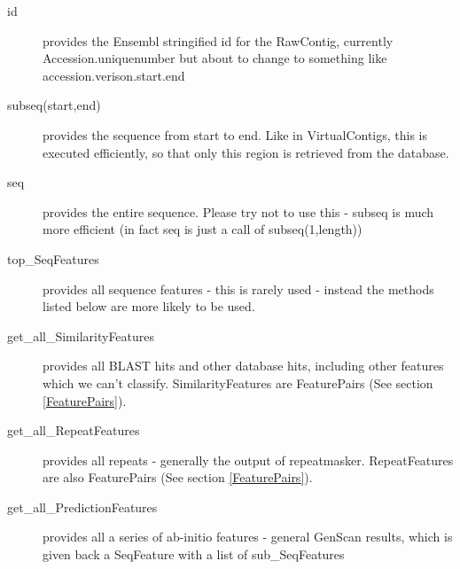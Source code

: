 \documentclass[11pt,a4paper]{article}
\begin{document}
\begin{description}

\item[id] provides the Ensembl stringified id for the RawContig,
currently Accession.uniquenumber but about to change to something
like accession.verison.start.end


\item[subseq(start,end)] provides the sequence from start to end. Like in VirtualContigs,
this is executed efficiently, so that only this region is retrieved from the database.

\item[seq] provides the entire sequence. Please try not to use this - subseq is much more
efficient (in fact seq is just a call of subseq(1,length))

\item[top\_SeqFeatures] provides all sequence features - this is rarely used - instead the
methods listed below are more likely to be used.

\item[get\_all\_SimilarityFeatures] provides all BLAST hits and other
database hits, including other features which we can't
classify. SimilarityFeatures are FeaturePairs (See section
\ref{FeaturePairs}).

\item[get\_all\_RepeatFeatures] provides all repeats - generally the
output of repeatmasker. RepeatFeatures are also FeaturePairs (See
section \ref{FeaturePairs}).

\item[get\_all\_PredictionFeatures] provides all a series of ab-initio
features - general GenScan results, which is given back a SeqFeature
with a list of sub\_SeqFeatures

\end{description}
\end{document}
